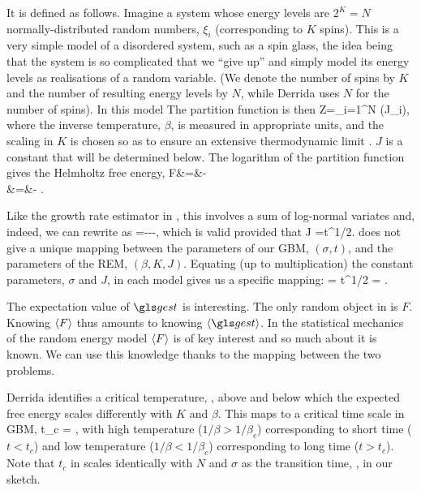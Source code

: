 It is defined as follows. Imagine a system whose energy levels are $2^K=N$ normally-distributed random numbers, $\xi_i$ (corresponding to $K$ spins). This is a very simple model of a disordered system, such as a spin glass, the idea being that the system is so complicated that we ``give up'' and simply model its energy levels as realisations of a random variable. (We denote the number 
of spins by $K$ and the number of resulting energy levels by $N$, while Derrida uses $N$ for the number of spins). In this model
The partition function is then
\be
Z=\sum_{i=1}^N \exp\left(\beta J\xi_i\right),
\ee
where the inverse temperature, $\beta$, is measured in appropriate units, and the scaling in $K$ is chosen
so as to ensure an extensive thermodynamic limit \cite[p.~79]{Derrida1980}. $J$ is a constant that will be determined below.
The logarithm of the partition function gives the Helmholtz free energy, 
\bea
F&=&-\\
&=&-  \ln\left[\sum_{i=1}^N \exp\left(\beta J \sqrt{\frac{K}{2}}\xi_i\right)\right].
\eea

Like the growth rate estimator in , this involves a sum of 
log-normal variates and, indeed, we can rewrite  as
\be
\gest=\mu---,
\ee
which is valid provided that
\be
\beta J =\sigma t^{1/2}.
\ee
{} does not give a unique mapping between the parameters of our GBM, $(\sigma, t)$, and the parameters of the REM, $(\beta, K, J)$. Equating (up to multiplication) the constant parameters, $\sigma$ and $J$, in each model gives us a specific mapping:
\be
\sigma= \quad {} \quad t^{1/2} = \beta{}.
\ee

The expectation value of $\gest$ is interesting. The only random object
in  is $F$. Knowing $\left\langle F \right\rangle$ thus amounts to knowing $\ave{\gest}$.
In the statistical mechanics of the random energy model $\left\langle F \right\rangle$ is of key
interest and so much about it is known. We can use this knowledge
thanks to the mapping between the two problems.

Derrida identifies a critical temperature,
\be
{} \equiv {},
\ee
above and below which the expected free energy scales differently with $K$ and $\beta$. This maps to a critical time scale in GBM,
\be
t_c = ,
\ee
with high temperature ($1/\beta>1/\beta_c$) corresponding to short time ($t<t_c$) and low temperature ($1/\beta<1/\beta_c$) corresponding to long time ($t>t_c$). Note that $t_c$ in  scales identically with $N$ and $\sigma$ as the transition time, , in our sketch.

